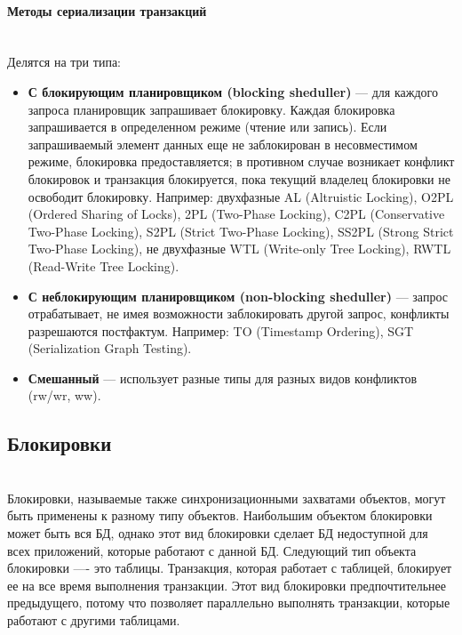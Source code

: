 \paragraph{Методы сериализации транзакций} \\

Делятся на три типа:
\begin{itemize}
\item \textbf{С блокирующим планировщиком (blocking sheduller)} — для каждого запроса планировщик запрашивает блокировку. Каждая блокировка запрашивается в определенном режиме (чтение или запись). Если запрашиваемый элемент данных еще не заблокирован в несовместимом режиме, блокировка предоставляется; в противном случае возникает конфликт блокировок и транзакция блокируется, пока текущий владелец блокировки не освободит блокировку. Например: двухфазные AL (Altruistic Locking), O2PL (Ordered Sharing of Locks), 2PL (Two-Phase Locking), C2PL (Conservative Two-Phase Locking), S2PL (Strict Two-Phase Locking), SS2PL (Strong Strict Two-Phase Locking), не двухфазные WTL (Write-only Tree Locking), RWTL (Read-Write Tree Locking).

\item \textbf{С неблокирующим планировщиком (non-blocking sheduller)} — запрос отрабатывает, не имея возможности заблокировать другой запрос, конфликты разрешаются постфактум. Например: TO (Timestamp Ordering), SGT (Serialization Graph Testing).

\item \textbf{Смешанный} — использует разные типы для разных видов конфликтов (rw/wr, ww).\autocite{TransactionalInformationSystems}
\end{itemize}

\subsection{Блокировки} ~\\

Блокировки, называемые также синхронизационными захватами объектов, могут быть применены к разному типу объектов. Наибольшим объектом блокировки может быть вся БД, однако этот вид блокировки сделает БД недоступной для всех приложений, которые работают с данной БД. Следующий тип объекта блокировки —- это таблицы. Транзакция, которая работает с таблицей, блокирует ее на все время выполнения транзакции. Этот вид блокировки предпочтительнее предыдущего, потому что позволяет параллельно выполнять транзакции, которые работают с другими таблицами.

